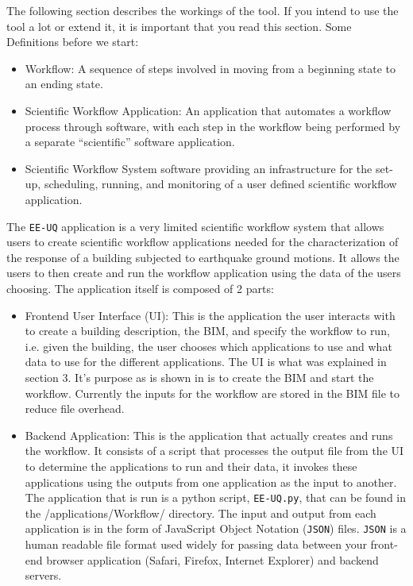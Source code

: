 The following section describes the workings of the tool. If you
intend to use the tool a lot or extend it, it is important that you
read this section.  Some Definitions before we start:
\begin{itemize}
\item Workflow: A sequence of steps involved in moving from a
  beginning state to an ending state.
\item Scientific Workflow Application: An application that automates a
  workflow process through software, with each step in the workflow
  being performed by a separate “scientific” software application.
\item Scientific Workflow System software providing an infrastructure
  for the set-up, scheduling, running, and monitoring of a user
  defined scientific workflow application.
\end{itemize}

The \texttt{EE-UQ} application is a very limited scientific workflow system
that allows users to create scientific workflow applications needed
for the characterization of the response of a building subjected to
earthquake ground motions. It allows the users to then create and run
the workflow application using the data of the users choosing. The
application itself is composed of 2 parts:

\begin{itemize}
\item Frontend User Interface (UI): This is the application the user
  interacts with to create a building description, the BIM, and
  specify the workflow to run, i.e. given the building, the user
  chooses which applications to use and what data to use for the
  different applications.  The UI is what was explained in section
  3. It’s purpose as is shown in  is to create
  the BIM and start the workflow.  Currently the inputs for the
  workflow are stored in the BIM file to reduce file overhead.
\item Backend Application: This is the application that actually
  creates and runs the workflow. It consists of a script that
  processes the output file from the UI to determine the applications
  to run and their data, it invokes these applications using the
  outputs from one application as the input to another. The
  application that is run is a python script, \texttt{EE-UQ.py}, that can be
  found in the /applications/Workflow/ directory.  The input and
  output from each application is in the form of JavaScript Object
  Notation (\texttt{JSON}) files. \texttt{JSON} is a human readable file format used
  widely for passing data between your front-end browser application
  (Safari, Firefox, Internet Explorer) and backend servers.
\end{itemize}



